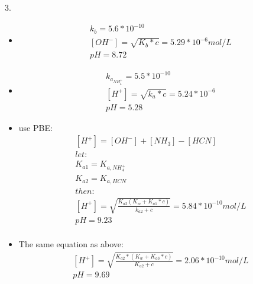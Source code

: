 \documentclass{article}
\begin{document}
3.\begin{itemize}
    \item
    \begin{equation}
        \begin{multlined}
            k_b = 5.6*10^{-10}\\
            \left[OH^-\right] = \sqrt{K_b*c} = 5.29*10^{-6} mol/L\\
            pH = 8.72
        \end{multlined}
    \end{equation}
    \item
    \begin{equation}
        \begin{multlined}
            k_a_{NH_4^+} = 5.5*10^{-10}\\
            \left[H^+\right] = \sqrt{k_a*c} = 5.24*10^{-6}\\
            pH = 5.28
        \end{multlined}
    \end{equation}
    \item
    use PBE:\\
    \begin{equation}
        \begin{multlined}
            \left[H^+\right] = \left[OH^-\right] + \left[NH_3\right] - \left[HCN\right]\\
            let:\\
            K_{a1} = K_{a, NH_4^+}\\
            K_{a2} = K_{a, HCN}\\
            then:\\
            \left[H^+\right] = \sqrt{\frac{K_{a2}\left(K_w+K_{a1}*c\right)}{k_{a2}+c}} = 5.84*10^{-10} mol/L\\
            pH = 9.23\\
        \end{multlined}
    \end{equation}
    \item
    The same equation as above:\\
    \begin{equation}
        \begin{multlined}
            \left[H^+\right] = \sqrt{\frac{K_{a2}*\left(K_w+K_{a3}*c\right)}{K_{a2}+c}} = 2.06*10^{-10} mol/L\\
            pH = 9.69\\
        \end{multlined}
    \end{equation}

\end{itemize}
\end{document}
